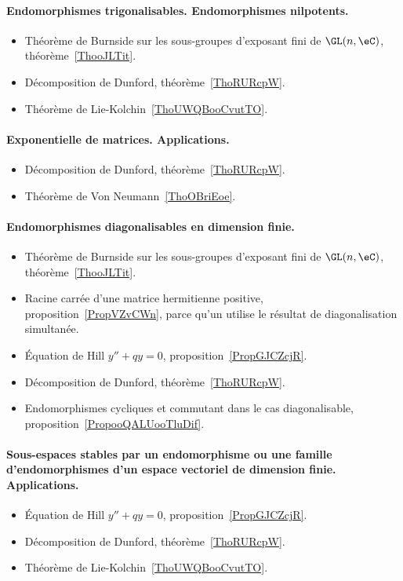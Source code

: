 \paragraph{Endomorphismes trigonalisables. Endomorphismes nilpotents.}
\begin{itemize}
	\item Théorème de Burnside sur les sous-groupes d'exposant fini de \( \GL(n,\eC)\), théorème~\ref{ThooJLTit}.
	\item Décomposition de Dunford, théorème~\ref{ThoRURcpW}.
	\item Théorème de Lie-Kolchin~\ref{ThoUWQBooCvutTO}.
\end{itemize}
\paragraph{Exponentielle de matrices. Applications.}
\begin{itemize}
	\item Décomposition de Dunford, théorème~\ref{ThoRURcpW}.
	\item Théorème de Von Neumann~\ref{ThoOBriEoe}.
\end{itemize}
\paragraph{Endomorphismes diagonalisables en dimension finie.}
\begin{itemize}
	\item Théorème de Burnside sur les sous-groupes d'exposant fini de \( \GL(n,\eC)\), théorème~\ref{ThooJLTit}.
	\item Racine carrée d'une matrice hermitienne positive, proposition~\ref{PropVZvCWn}, parce qu'un utilise le résultat de diagonalisation simultanée.
	\item Équation de Hill \( y''+qy=0\), proposition~\ref{PropGJCZcjR}.
	\item Décomposition de Dunford, théorème~\ref{ThoRURcpW}.
	\item Endomorphismes cycliques et commutant dans le cas diagonalisable, proposition~\ref{PropooQALUooTluDif}.
\end{itemize}
\paragraph{Sous-espaces stables par un endomorphisme ou une famille d'endomorphismes d’un espace vectoriel de dimension finie. Applications.}
\begin{itemize}
	\item Équation de Hill \( y''+qy=0\), proposition~\ref{PropGJCZcjR}.
	\item Décomposition de Dunford, théorème~\ref{ThoRURcpW}.
	\item Théorème de Lie-Kolchin~\ref{ThoUWQBooCvutTO}.
\end{itemize}
